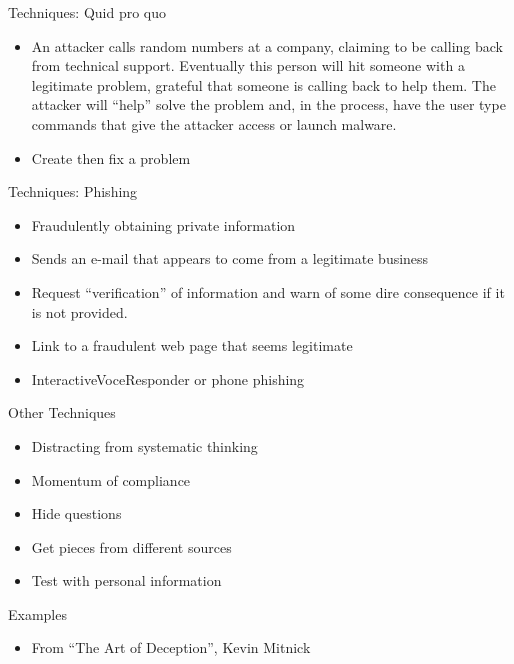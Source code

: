 \documentclass{beamer}
\begin{document}
\begin{frame}{Techniques: Quid pro quo}
  
  \begin{itemize}
    \item An attacker calls random numbers at a company, claiming to
      be calling back from technical support. Eventually this person
      will hit someone with a legitimate problem, grateful that
      someone is calling back to help them. The attacker will ``help''
      solve the problem and, in the process, have the user type
      commands that give the attacker access or launch malware.
    \item Create then fix a problem
  \end{itemize}
\end{frame}

\begin{frame}{Techniques: Phishing}
  \begin{itemize}
    \item Fraudulently obtaining private information
    \item Sends an e-mail that appears to come from a legitimate
      business
    \item Request ``verification'' of information and warn of
      some dire consequence if it is not provided. 
    \item Link to a fraudulent web page that seems legitimate
    \item InteractiveVoceResponder or phone phishing
  \end{itemize}
\end{frame}

\begin{frame}{Other Techniques}
  \begin{itemize}
    \item Distracting from systematic thinking
    \item Momentum of compliance
    \item Hide questions
    \item Get pieces from different sources
    \item Test with personal information
  \end{itemize}
\end{frame}

\begin{frame}{Examples}
  \begin{itemize}
  \item From ``The Art of Deception'', Kevin Mitnick
  \end{itemize}
\end{frame}
\end{document}
